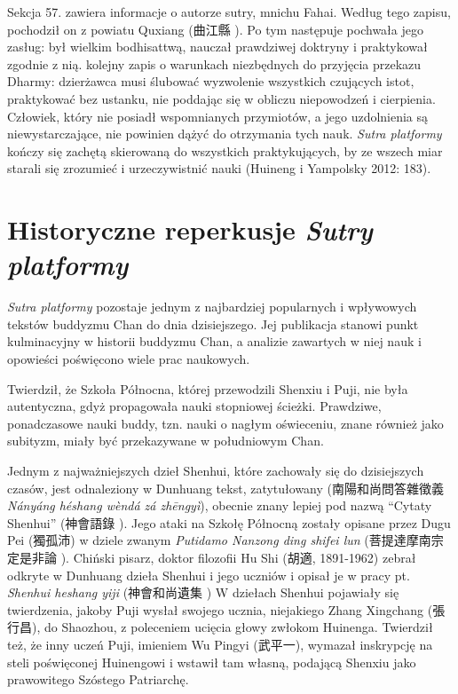 Sekcja 57. zawiera informacje o autorze sutry, mnichu Fahai. Według tego zapisu, pochodził on z powiatu Quxiang (曲江縣 ).
Po tym następuje pochwała jego zasług: był wielkim bodhisattwą, nauczał prawdziwej doktryny i praktykował zgodnie z nią.
kolejny zapis o warunkach niezbędnych do przyjęcia przekazu Dharmy: dzierżawca musi ślubować wyzwolenie wszystkich czujących istot, praktykować bez ustanku, nie poddając się w obliczu niepowodzeń i cierpienia.
Człowiek, który nie posiadł wspomnianych przymiotów, a jego uzdolnienia są niewystarczające, nie powinien dążyć do otrzymania tych nauk.
\textit{Sutra platformy} kończy się zachętą skierowaną do wszystkich praktykujących, by ze wszech miar starali się zrozumieć i urzeczywistnić nauki
(Huineng i Yampolsky 2012: 183).


\chapter{Historyczne reperkusje \textit{Sutry platformy}}
\textit{Sutra platformy} pozostaje jednym z najbardziej popularnych i wpływowych tekstów buddyzmu Chan do dnia dzisiejszego. Jej publikacja stanowi punkt kulminacyjny w historii buddyzmu Chan, a analizie zawartych w niej nauk i opowieści poświęcono wiele prac naukowych.

Twierdził, że Szkoła Północna, której przewodzili Shenxiu i Puji, nie była autentyczna, gdyż propagowała nauki stopniowej ścieżki. Prawdziwe, ponadczasowe nauki buddy, tzn. nauki o nagłym oświeceniu, znane również jako subityzm, miały być przekazywane w południowym Chan.

Jednym z najważniejszych dzieł Shenhui, które zachowały się do dzisiejszych czasów, jest odnaleziony w Dunhuang tekst, zatytułowany  (南陽和尚問答雜徵義 \textit{Nányáng héshang wèndá zá zhēngyì}), obecnie znany lepiej pod nazwą ``Cytaty Shenhui'' (神會語錄 ).
Jego ataki na Szkołę Północną zostały opisane przez Dugu Pei (獨孤沛) w dziele zwanym \textit{Putidamo Nanzong ding shifei lun} (菩提達摩南宗定是非論 ).
Chiński pisarz, doktor filozofii Hu Shi (胡適, 1891-1962) zebrał odkryte w Dunhuang dzieła Shenhui i jego uczniów i opisał je w pracy pt. \textit{Shenhui heshang yiji} (神會和尚遺集 )
W dziełach Shenhui pojawiały się twierdzenia, jakoby Puji wysłał swojego ucznia, niejakiego Zhang Xingchang (張行昌), do Shaozhou, z poleceniem ucięcia głowy zwłokom Huinenga.
Twierdził też, że inny uczeń Puji, imieniem Wu Pingyi (武平一), wymazał inskrypcję na steli poświęconej Huinengowi i wstawił tam własną, podającą Shenxiu jako prawowitego Szóstego Patriarchę.

